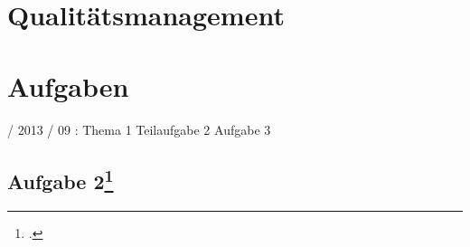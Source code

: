 \documentclass{lehramt-informatik}
\begin{document}

\chapter{Qualitätsmanagement}


\chapter{Aufgaben}

 / 2013 / 09 : Thema 1 Teilaufgabe 2 Aufgabe 3

%

\section{Aufgabe 2\footcite{sosy:ab:9}}
\end{document}

